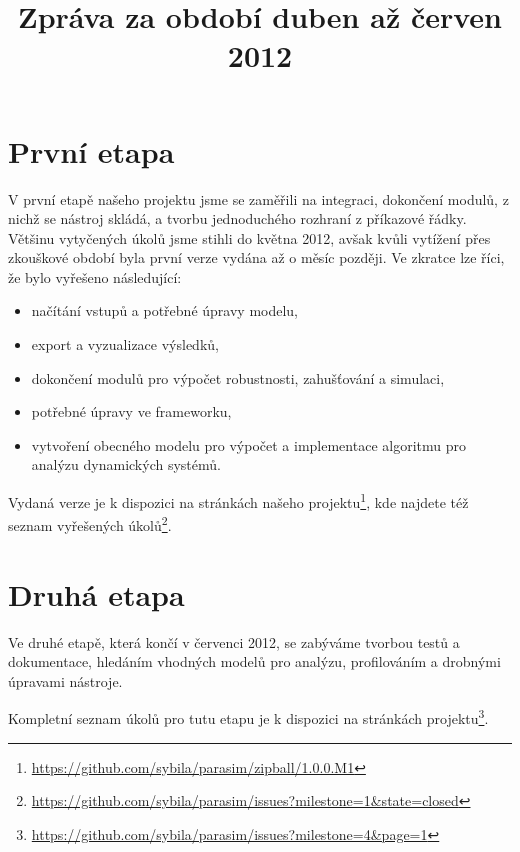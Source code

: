 \documentclass{parasim}
\title{Zpráva za období duben až červen 2012}
\begin{document}
\section{První etapa}

V první etapě našeho projektu jsme se zaměřili na integraci, dokončení modulů,
z nichž se nástroj skládá, a tvorbu jednoduchého rozhraní
z příkazové řádky. Většinu vytyčených úkolů jsme stihli do května 2012, avšak
kvůli vytížení přes zkouškové období byla první verze vydána až o měsíc později.
Ve zkratce lze říci, že bylo vyřešeno následující:

\begin{itemize}
    \item   načítání vstupů a potřebné úpravy modelu,
    \item   export a vyzualizace výsledků,
    \item   dokončení modulů pro výpočet robustnosti, zahušťování a simulaci,
    \item   potřebné úpravy ve frameworku,
    \item   vytvoření obecného modelu pro výpočet a implementace algoritmu pro analýzu dynamických systémů.
\end{itemize}


Vydaná verze je k dispozici na stránkách našeho projektu\footnote{\url{https://github.com/sybila/parasim/zipball/1.0.0.M1}},
kde najdete též seznam vyřešených úkolů\footnote{\url{https://github.com/sybila/parasim/issues?milestone=1&state=closed}}.

\section{Druhá etapa}

Ve druhé etapě, která končí v červenci 2012, se zabýváme tvorbou testů a dokumentace,
hledáním vhodných modelů pro analýzu, profilováním a drobnými úpravami nástroje.

Kompletní seznam úkolů pro tutu etapu je k dispozici na stránkách projektu\footnote{\url{https://github.com/sybila/parasim/issues?milestone=4&page=1}}.
\end{document}
